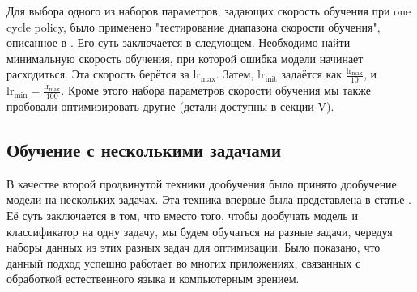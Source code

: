 \documentclass[conference]{IEEEtran}
\begin{document}
Для выбора одного из наборов параметров, задающих скорость обучения при one cycle policy, было применено "тестирование диапазона скорости обучения", описанное в \cite{lr-range-test}. Его суть заключается в следующем. Необходимо найти минимальную скорость обучения, при которой ошибка модели начинает расходиться. Эта скорость берётся за $\text{lr}_\text{max}$. Затем, $\text{lr}_\text{init}$ задаётся как $\frac{\text{lr}_\text{max}}{10}$, и $\text{lr}_\text{min} = \frac{\text{lr}_\text{max}}{100}$. Кроме этого набора параметров скорости обучения мы также пробовали оптимизировать другие (детали доступны в секции V).

\subsection{Обучение с несколькими задачами}
В качестве второй продвинутой техники дообучения было принято дообучение модели на нескольких задачах. Эта техника впервые была представлена в статье \cite{multi-task-learning}. Её суть заключается в том, что вместо того, чтобы дообучать модель и классификатор на одну задачу, мы будем обучаться на разные задачи, чередуя наборы данных из этих разных задач для оптимизации. Было показано, что данный подход успешно работает во многих приложениях, связанных с обработкой естественного языка и компьютерным зрением.
\end{document}
